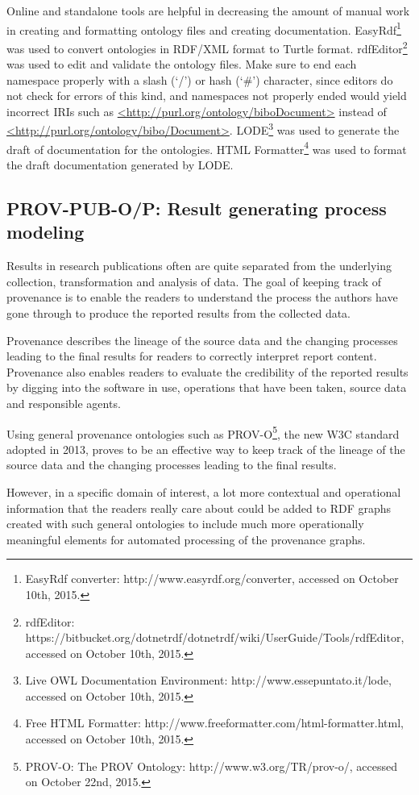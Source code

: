 Online and standalone tools are helpful in decreasing the amount of manual work in creating and formatting ontology files and creating documentation. EasyRdf\footnote{EasyRdf converter: http://www.easyrdf.org/converter, accessed on October 10th, 2015.} was used to convert ontologies in RDF/XML format to Turtle format. rdfEditor\footnote{rdfEditor: https://bitbucket.org/dotnetrdf/dotnetrdf/wiki/UserGuide/Tools/rdfEditor, accessed on October 10th, 2015.} was used to edit and validate the ontology files. Make sure to end each namespace properly with a slash (`/') or hash (`\#') character, since editors do not check for errors of this kind, and namespaces not properly ended would yield incorrect IRIs such as \url{<http://purl.org/ontology/biboDocument>} instead of \url{<http://purl.org/ontology/bibo/Document>}. LODE\footnote{Live OWL Documentation Environment: http://www.essepuntato.it/lode, accessed on October 10th, 2015.} was used to generate the draft of documentation for the ontologies. HTML Formatter\footnote{Free HTML Formatter: http://www.freeformatter.com/html-formatter.html, accessed on October 10th, 2015.} was used to format the draft documentation generated by LODE.

\subsection{PROV-PUB-O/P: Result generating process modeling}
\label{subsec:process}
Results in research publications often are quite separated from the underlying collection, transformation and analysis of data. The goal of keeping track of provenance is to enable the readers to understand the process the authors have gone through to produce the reported results from the collected data.

Provenance describes the lineage of the source data and the changing processes leading to the final results for readers to correctly interpret report content. Provenance also enables readers to evaluate the credibility of the reported results by digging into the software in use, operations that have been taken, source data and responsible agents.

Using general provenance ontologies such as PROV-O\footnote{PROV-O: The PROV Ontology: http://www.w3.org/TR/prov-o/, accessed on October 22nd, 2015.}, the new W3C standard adopted in 2013, proves to be an effective way to keep track of the lineage of the source data and the changing processes leading to the final results.

However, in a specific domain of interest, a lot more contextual and operational information that the readers really care about could be added to RDF graphs created with such general ontologies to include much more operationally meaningful elements for automated processing of the provenance graphs.

